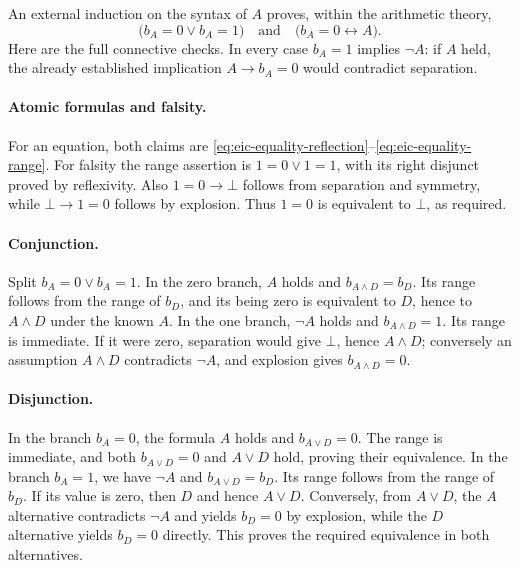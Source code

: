 \documentclass[11pt,letterpaper]{article}
\theoremstyle{definition}\newtheorem{definition}[theorem]{Definition}
\theoremstyle{remark}\newtheorem{remark}[theorem]{Remark}
\begin{document}
An external induction on the syntax of $A$ proves, within the arithmetic
theory,
\begin{equation}
 \bigl(b_A=0\lor b_A=1\bigr)
 \quad\text{and}\quad
 \bigl(b_A=0\longleftrightarrow A\bigr).
 \label{eq:eic-boolean-correctness}
\end{equation}
Here are the full connective checks.  In every case $b_A=1$ implies
$\neg A$: if $A$ held, the already established implication
$A\to b_A=0$ would contradict separation.

\paragraph{Atomic formulas and falsity.}
For an equation, both claims are
\eqref{eq:eic-equality-reflection}--\eqref{eq:eic-equality-range}.
For falsity the range assertion is $1=0\lor1=1$, with its right disjunct
proved by reflexivity.  Also $1=0\to\bot$ follows from separation and
symmetry, while $\bot\to1=0$ follows by explosion.  Thus $1=0$ is
equivalent to $\bot$, as required.

\paragraph{Conjunction.}
Split $b_A=0\lor b_A=1$.  In the zero branch, $A$ holds and
$b_{A\land D}=b_D$.  Its range follows from the range of $b_D$,
and its being zero is equivalent to $D$, hence to $A\land D$ under
the known $A$.  In the one branch, $\neg A$ holds and
$b_{A\land D}=1$.  Its range is immediate.  If it were zero,
separation would give $\bot$, hence $A\land D$; conversely an
assumption $A\land D$ contradicts $\neg A$, and explosion gives
$b_{A\land D}=0$.

\paragraph{Disjunction.}
In the branch $b_A=0$, the formula $A$ holds and
$b_{A\lor D}=0$.  The range is immediate, and both $b_{A\lor D}=0$
and $A\lor D$ hold, proving their equivalence.  In the branch
$b_A=1$, we have $\neg A$ and $b_{A\lor D}=b_D$.  Its range follows
from the range of $b_D$.  If its value is zero, then $D$ and hence
$A\lor D$.  Conversely, from $A\lor D$, the $A$ alternative
contradicts $\neg A$ and yields $b_D=0$ by explosion, while the
$D$ alternative yields $b_D=0$ directly.  This proves the required
equivalence in both alternatives.
\end{document}

